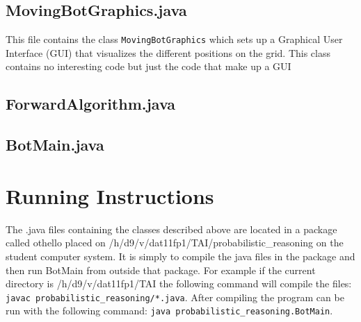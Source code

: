 \documentclass[a4paper]{article}
\begin{document}
\subsection{MovingBotGraphics.java}
This file contains the class \texttt{MovingBotGraphics} which sets up a Graphical User Interface (GUI) that visualizes the different positions on the grid. This class contains no interesting code but just the code that make up a GUI
\subsection{ForwardAlgorithm.java}
\subsection{BotMain.java}

\section{Running Instructions} The .java files containing the classes described
above are located in a package called othello placed on
/h/d9/v/dat11fp1/TAI/probabilistic\_reasoning on the student computer system. It
is simply to compile the java files in the package and then run BotMain from
outside that package. For example if the current directory is
/h/d9/v/dat11fp1/TAI the following command will compile the files: \texttt{javac
probabilistic\_reasoning/*.java}. After compiling the program can be run with
the following command: \texttt{java probabilistic\_reasoning.BotMain}.

\end{document}
